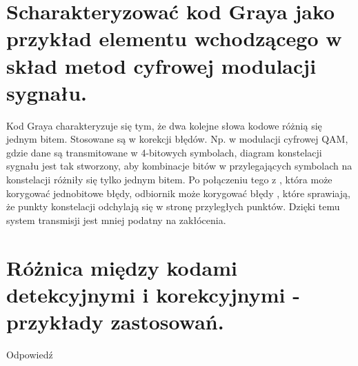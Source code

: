 \documentclass[12pt,a4paper]{article}
\begin{document}
	\section{Scharakteryzować kod Graya jako przykład elementu wchodzącego w skład metod cyfrowej modulacji sygnału.}
	Kod Graya charakteryzuje się tym, że dwa kolejne słowa kodowe różnią się jednym bitem. Stosowane są w korekcji błędów. Np. w modulacji cyfrowej QAM, gdzie dane są transmitowane w 4-bitowych symbolach, diagram konstelacji sygnału jest tak stworzony, aby kombinacje bitów w przylegających symbolach na konstelacji różniły się tylko jednym bitem. Po połączeniu tego z , która może korygować jednobitowe błędy, odbiornik może korygować błędy , które sprawiają, że punkty konstelacji odchylają się w stronę przyległych punktów. Dzięki temu system transmisji jest mniej podatny na zakłócenia.

	\section{Różnica między kodami detekcyjnymi i korekcyjnymi - przykłady zastosowań.}
	Odpowiedź
\end{document}

